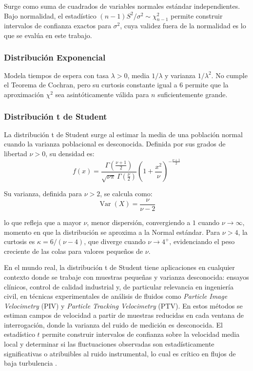 \documentclass[11pt]{article}
\begin{document}
Surge como suma de cuadrados de variables normales estándar independientes. 
Bajo normalidad, el estadístico $(n-1)S^2/\sigma^2 \sim \chi^2_{n-1}$ permite 
construir intervalos de confianza exactos para $\sigma^2$, cuya validez fuera 
de la normalidad es lo que se evalúa en este trabajo.

\subsubsection{Distribución Exponencial}

Modela tiempos de espera con tasa $\lambda > 0$, media $1/\lambda$ y varianza 
$1/\lambda^2$. No cumple el Teorema de Cochran, pero su curtosis constante 
igual a $6$ permite que la aproximación $\chi^2$ sea asintóticamente válida 
para $n$ suficientemente grande.

\subsubsection{Distribución t de Student}

La distribución t de Student  \cite{student1908probable} surge al estimar la media de una población normal 
cuando la varianza poblacional es desconocida. Definida por sus grados de 
libertad $\nu > 0$, su densidad es:
\begin{equation}
f(x) = \frac{\Gamma\!\left(\frac{\nu+1}{2}\right)}{\sqrt{\nu\pi}\,\Gamma\!\left(\frac{\nu}{2}\right)}
\left(1+\frac{x^2}{\nu}\right)^{-\frac{\nu+1}{2}}
\end{equation}

Su varianza, definida para $\nu > 2$, se calcula como:
\begin{equation}
\operatorname{Var}(X) = \frac{\nu}{\nu - 2}
\end{equation}

lo que refleja que a mayor $\nu$, menor dispersión, convergiendo a $1$ cuando 
$\nu \to \infty$, momento en que la distribución se aproxima a la Normal estándar. 
Para $\nu > 4$, la curtosis es $\kappa = 6/(\nu-4)$, que diverge cuando 
$\nu \to 4^+$, evidenciando el peso creciente de las colas para valores pequeños 
de $\nu$.

En el mundo real, la distribución t de Student tiene aplicaciones en cualquier 
contexto donde se trabaje con muestras pequeñas y varianza desconocida: ensayos 
clínicos, control de calidad industrial y, de particular relevancia en ingeniería 
civil, en técnicas experimentales de análisis de fluidos como \textit{Particle 
Image Velocimetry} (PIV) y \textit{Particle Tracking Velocimetry} (PTV). En estos 
métodos se estiman campos de velocidad a partir de muestras reducidas en cada 
ventana de interrogación, donde la varianza del ruido de medición es desconocida. 
El estadístico $t$ permite construir intervalos de confianza sobre la velocidad 
media local y determinar si las fluctuaciones observadas son estadísticamente 
significativas o atribuibles al ruido instrumental, lo cual es crítico en flujos 
de baja turbulencia \cite{westerweel1997fundamentals, adrian2011particle}.
\end{document}
